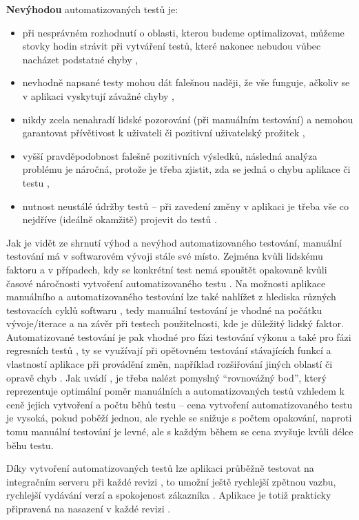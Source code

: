 \textbf{Nevýhodou} automatizovaných testů je:
\begin{itemize}
    \item při nesprávném rozhodnutí o oblasti, kterou budeme optimalizovat, můžeme stovky hodin strávit při vytváření testů, které nakonec nebudou vůbec nacházet podstatné chyby \cite{test-kitner},
    \item nevhodně napsané testy mohou dát falešnou naději, že vše funguje, ačkoliv se v aplikaci vyskytují závažné chyby \cite{test-devqa},
    \item nikdy zcela nenahradí lidské pozorování (při manuálním testování) a nemohou garantovat přívětivost k uživateli či pozitivní uživatelský prožitek \cite{test-genez},
    \item vyšší pravděpodobnost falešně pozitivních výsledků, následná analýza problému je náročná, protože je třeba zjistit, zda se jedná o chybu aplikace či testu \cite{test-perfecto},
    \item nutnost neustálé údržby testů -- při zavedení změny v aplikaci je třeba vše co nejdříve (ideálně okamžitě) projevit do testů \cite{test-swsrovnani}.
\end{itemize}

Jak je vidět ze shrnutí výhod a nevýhod automatizovaného testování, manuální testování má v softwarovém vývoji stále své místo. Zejména kvůli lidskému faktoru a v případech, kdy se konkrétní test nemá spouštět opakovaně kvůli časové náročnosti vytvoření automatizovaného testu \cite{test-bdo}. Na možnosti aplikace manuálního a automatizovaného testování lze také nahlížet z hlediska různých testovacích cyklů softwaru \cite{test-bdo}, tedy manuální testování je vhodné na počátku vývoje/iterace a na závěr při testech použitelnosti, kde je důležitý lidský faktor. Automatizované testování je pak vhodné pro fázi testování výkonu a také pro fázi regresních testů \cite{test-bdo}, ty se využívají při opětovném testování stávajících funkcí a vlastností aplikace při provádění změn, například rozšiřování jiných oblastí či opravě chyb \cite{test-regresni}. Jak uvádí \cite{test-bdo}, je třeba nalézt pomyslný \enquote{rovnovážný bod}, který reprezentuje optimální poměr manuálních a automatizovaných testů vzhledem k ceně jejich vytvoření a počtu běhů testu -- cena vytvoření automatizovaného testu je vysoká, pokud poběží jednou, ale rychle se snižuje s počtem opakování, naproti tomu manuální testování je levné, ale s každým během se cena zvyšuje kvůli délce běhu testu.

Díky vytvoření automatizovaných testů lze aplikaci průběžně testovat na integračním serveru při každé revizi \cite{test-kitner}, to umožní ještě rychlejší zpětnou vazbu, rychlejší vydávání verzí a spokojenost zákazníka \cite{test-perfecto}. Aplikace je totiž prakticky připravená na nasazení v každé revizi \cite{test-atlassian}.

